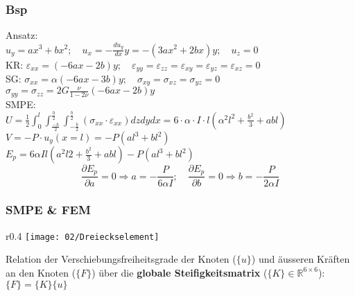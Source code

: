         \subsubsection{Bsp}
            Ansatz:\\
            $u_y=ax^3+bx^2; \quad u_x=-\frac{du_y}{dx}y= -(3ax^2+2bx)y; \quad u_z = 0$\\
            KR: $\varepsilon_{xx} =(-6ax-2b)y; \quad \varepsilon_{yy}=\varepsilon_{zz}=\varepsilon_{xy}=\varepsilon_{yz} = \varepsilon_{xz}=0$\\
            SG: $\sigma_{xx} = \alpha(-6ax-3b)y; \quad \sigma_{xy}=\sigma_{xz}=\sigma_{yz}=0$\\ $\sigma_{yy}=\sigma_{zz}=2G\frac{\nu}{1-2\nu}(-6ax-2b)y$\\
            SMPE:\\
            $U=\frac{1}{2}\int_0^l\int_\frac{-h}{2}^\frac{h}{2}\int_{-\frac{b}{2}}^\frac{b}{2}(\sigma_{xx}\cdot\varepsilon_{xx})dzdydx=6\cdot\alpha\cdot I\cdot l(\alpha^2l^2+\frac{b^2}{3}+abl)$\\
            $V=-P\cdot u_y(x=l)=-P(al^3+bl^2)$\\
            $E_p=6\alpha Il(a^2l2+\frac{b^2}{3}+abl)-P(al^3+bl^2)$
            \vspace{-3mm}
            \small\[\frac{\partial E_p}{\partial a} = 0 \Rightarrow a=-\frac{P}{6\alpha I};\quad\frac{\partial E_p}{\partial b} = 0 \Rightarrow b=-\frac{P}{2\alpha I}\]\normalsize
        \vspace{-3mm}    
        \subsubsection{SMPE \& FEM}
            \begin{wrapfigure}[5]{r}{0.4\linewidth}
                \vspace{-5mm}
                \texttt{[image: 02/Dreieckselement]}
            \end{wrapfigure}
            Relation der Verschiebungsfreiheitsgrade der Knoten ($\{u\}$) und äusseren Kräften an den Knoten ($\{F\}$) über die \textbf{globale Steifigkeitsmatrix} ($\{K\}\in\mathbb{R}^{6\times6}$): $\{F\}=\{K\}\{u\}$
            
